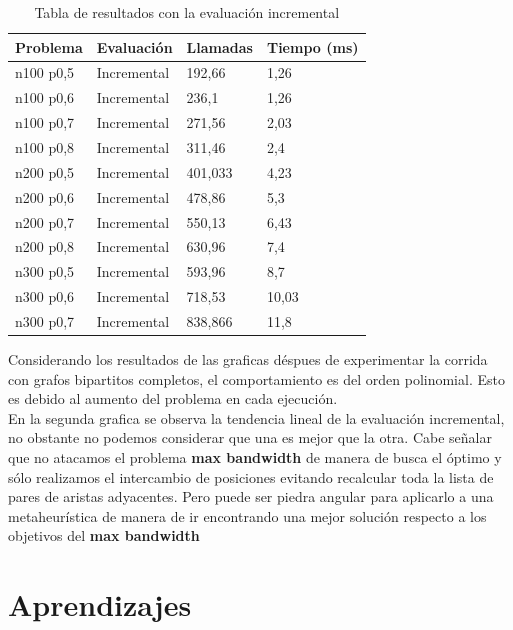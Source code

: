 \documentclass[oneside,onecolumn]{article}
\begin{document}
\begin{table}[h]
  \caption{Tabla de resultados con la evaluación incremental}
  \centering
  \begin{tabular}{|l|l|l|l|}
    \hline
    Problema  & Evaluación  & Llamadas & Tiempo (ms) \\ \hline
    n100 p0,5 & Incremental & 192,66   & 1,26        \\ \hline
    n100 p0,6 & Incremental & 236,1    & 1,26        \\ \hline
    n100 p0,7 & Incremental & 271,56   & 2,03        \\ \hline
    n100 p0,8 & Incremental & 311,46   & 2,4         \\ \hline
    n200 p0,5 & Incremental & 401,033  & 4,23        \\ \hline
    n200 p0,6 & Incremental & 478,86   & 5,3         \\ \hline
    n200 p0,7 & Incremental & 550,13   & 6,43        \\ \hline
    n200 p0,8 & Incremental & 630,96   & 7,4         \\ \hline
    n300 p0,5 & Incremental & 593,96   & 8,7         \\ \hline
    n300 p0,6 & Incremental & 718,53   & 10,03       \\ \hline
    n300 p0,7 & Incremental & 838,866  & 11,8        \\ \hline
  \end{tabular}
\end{table}



Considerando los resultados de las graficas déspues de experimentar la corrida con grafos bipartitos completos, el comportamiento es del orden polinomial. Esto es debido al aumento del problema en cada ejecución.\\

En la segunda grafica se observa la tendencia lineal de la evaluación incremental, no obstante no podemos considerar que una es mejor que la otra. Cabe señalar que no atacamos el problema \textbf{max bandwidth} de manera de busca el óptimo y sólo realizamos el intercambio de posiciones evitando recalcular toda la lista de pares de aristas adyacentes. Pero puede ser piedra angular para aplicarlo a una metaheurística de manera de ir encontrando una mejor solución respecto a los objetivos del \textbf{max bandwidth}


\newpage
\section{Aprendizajes}
\end{document}
